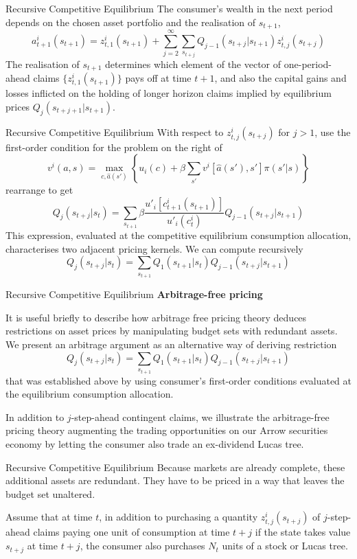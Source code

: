 \documentclass[aspectratio=169,xcolor=dvipsnames]{beamer}
\begin{document}
\begin{frame}{Recursive Competitive Equilibrium}
    The consumer's wealth in the next period depends on the chosen asset portfolio and the realisation of $s_{t+1}$,
    \[
        a^i_{t+1}(s_{t+1}) = z^i_{t,1}(s_{t+1}) + \sum_{j=2}^\infty \sum_{s_{t+j}} Q_{j-1}(s_{t+j} | s_{t+1}) z^i_{t,j}(s_{t+j})
    \]
    The realisation of $s_{t+1}$ determines which element of the vector of one-period-ahead claims $\{z^i_{t,1}(s_{t+1})\}$ pays off at time $t+1$, and also the capital gains and losses inflicted on the holding of longer horizon claims implied by equilibrium prices $Q_j(s_{t+j+1} | s_{t+1})$.
\end{frame}

\begin{frame}{Recursive Competitive Equilibrium}
    With respect to $z^i_{t,j}(s_{t+j})$ for $j > 1$, use the first-order condition for the problem on the right of
    \[
        v^i(a, s) = \max_{c, \hat a(s')} \left\{ u_i(c) + \beta \sum_{s'} v^i[\hat a(s'), s'] \pi(s' | s)\right\}
    \]
    rearrange to get
    \[
        Q_j(s_{t+j} | s_t) = \sum_{s_{t+1}} \beta \frac{u'_i[c^i_{t+1}(s_{t+1})]}{u'_i(c^i_t)} Q_{j-1}(s_{t+j} | s_{t+1})
    \]
    This expression, evaluated at the competitive equilibrium consumption allocation, characterises two adjacent pricing kernels. We can compute recursively
    \[
        Q_j(s_{t+j} | s_t) = \sum_{s_{t+1}} Q_1(s_{t+1} | s_t) Q_{j-1}(s_{t+j} | s_{t+1})
    \]
\end{frame}

\begin{frame}{Recursive Competitive Equilibrium}
    \textbf{Arbitrage-free pricing}

    It is useful briefly to describe how arbitrage free pricing theory deduces restrictions on asset prices by manipulating budget sets with redundant assets. We present an arbitrage argument as an alternative way of deriving restriction
    \[
        Q_j(s_{t+j} | s_t) = \sum_{s_{t+1}} Q_1(s_{t+1} | s_t) Q_{j-1}(s_{t+j} | s_{t+1})
    \]
    that was established above by using consumer's first-order conditions evaluated at the equilibrium consumption allocation.

    In addition to $j$-step-ahead contingent claims, we illustrate the arbitrage-free pricing theory augmenting the trading opportunities on our Arrow securities economy by letting the consumer also trade an ex-dividend Lucas tree.
\end{frame}

\begin{frame}{Recursive Competitive Equilibrium}
    Because markets are already complete, these additional assets are redundant. They have to be priced in a way that leaves the budget set unaltered.

    Assume that at time $t$, in addition to purchasing a quantity $z^i_{t,j}(s_{t+j})$ of $j$-step-ahead claims paying one unit of consumption at time $t+j$ if the state takes value $s_{t+j}$ at time $t+j$, the consumer also purchases $N_t$ units of a stock or Lucas tree.
\end{frame}
\end{document}
